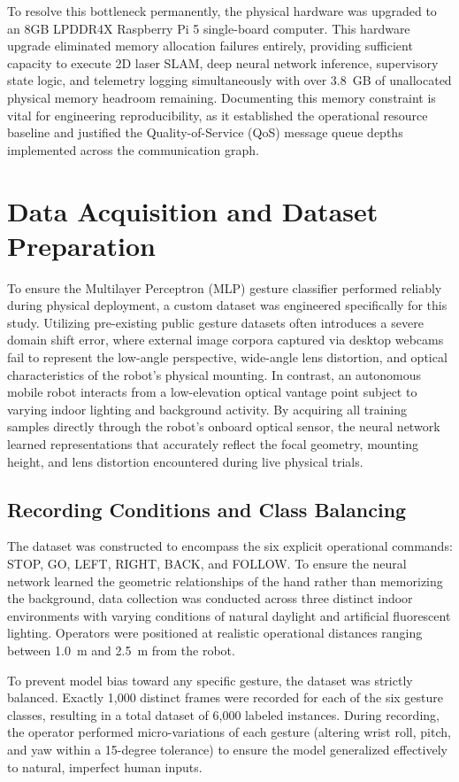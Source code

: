 To resolve this bottleneck permanently, the physical hardware was upgraded to an 8GB LPDDR4X Raspberry Pi 5 single-board computer. This hardware upgrade eliminated memory allocation failures entirely, providing sufficient capacity to execute 2D laser SLAM, deep neural network inference, supervisory state logic, and telemetry logging simultaneously with over 3.8~GB of unallocated physical memory headroom remaining. Documenting this memory constraint is vital for engineering reproducibility, as it established the operational resource baseline and justified the Quality-of-Service (QoS) message queue depths implemented across the communication graph.

\section{Data Acquisition and Dataset Preparation}
To ensure the Multilayer Perceptron (MLP) gesture classifier performed reliably during physical deployment, a custom dataset was engineered specifically for this study. Utilizing pre-existing public gesture datasets often introduces a severe domain shift error, where external image corpora captured via desktop webcams fail to represent the low-angle perspective, wide-angle lens distortion, and optical characteristics of the robot's physical mounting. In contrast, an autonomous mobile robot interacts from a low-elevation optical vantage point subject to varying indoor lighting and background activity. By acquiring all training samples directly through the robot's onboard optical sensor, the neural network learned representations that accurately reflect the focal geometry, mounting height, and lens distortion encountered during live physical trials.

\subsection{Recording Conditions and Class Balancing}
\label{sec:recording_conditions}
The dataset was constructed to encompass the six explicit operational commands: STOP, GO, LEFT, RIGHT, BACK, and FOLLOW. To ensure the neural network learned the geometric relationships of the hand rather than memorizing the background, data collection was conducted across three distinct indoor environments with varying conditions of natural daylight and artificial fluorescent lighting. Operators were positioned at realistic operational distances ranging between 1.0~m and 2.5~m from the robot.

To prevent model bias toward any specific gesture, the dataset was strictly balanced. Exactly 1,000 distinct frames were recorded for each of the six gesture classes, resulting in a total dataset of 6,000 labeled instances. During recording, the operator performed micro-variations of each gesture (altering wrist roll, pitch, and yaw within a 15-degree tolerance) to ensure the model generalized effectively to natural, imperfect human inputs.

